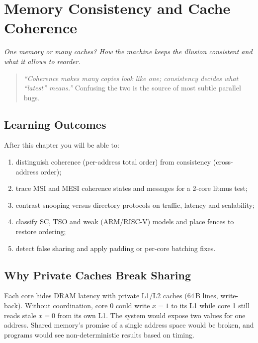 \chapter{Memory Consistency and Cache Coherence}\label{ch:consistency}
\begin{center}\small\textit{One memory or many caches? How the machine keeps the illusion consistent and what it allows to reorder.}\end{center}

\begin{quote}
\emph{``Coherence makes many copies look like one; consistency decides what ``latest'' means.''} Confusing the two is the source of most subtle parallel bugs.
\end{quote}

\noindent{}
\vspace{0.4em}

\section*{Learning Outcomes}
After this chapter you will be able to:
\begin{enumerate}[label=(L\arabic*)]
    \item distinguish coherence (per-address total order) from consistency (cross-address order);
    \item trace MSI and MESI coherence states and messages for a 2-core litmus test;
    \item contrast snooping versus directory protocols on traffic, latency and scalability;
    \item classify SC, TSO and weak (ARM/RISC-V) models and place fences to restore ordering;
    \item detect false sharing and apply padding or per-core batching fixes.
\end{enumerate}

\section{Why Private Caches Break Sharing}\label{sec:cache-break}
Each core hides DRAM latency with private L1/L2 caches (64\,B lines, write-back). Without coordination, core 0 could write $x=1$ to its L1 while core 1 still reads stale $x=0$ from its own L1. The system would expose two values for one address. Shared memory's promise of a single address space would be broken, and programs would see non-deterministic results based on timing.

